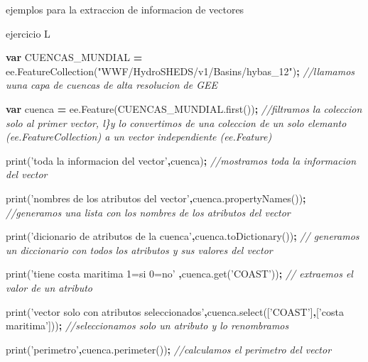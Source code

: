 \documentclass[
]{article}
\newenvironment{Shaded}{\begin{snugshade}}{\end{snugshade}}
\newcommand{\AttributeTok}[1]{\textcolor[rgb]{0.77,0.63,0.00}{#1}}
\newcommand{\CommentTok}[1]{\textcolor[rgb]{0.56,0.35,0.01}{\textit{#1}}}
\newcommand{\KeywordTok}[1]{\textcolor[rgb]{0.13,0.29,0.53}{\textbf{#1}}}
\newcommand{\NormalTok}[1]{#1}
\newcommand{\OperatorTok}[1]{\textcolor[rgb]{0.81,0.36,0.00}{\textbf{#1}}}
\newcommand{\StringTok}[1]{\textcolor[rgb]{0.31,0.60,0.02}{#1}}
\newcommand{\VariableTok}[1]{\textcolor[rgb]{0.00,0.00,0.00}{#1}}
\begin{document}
ejemplos para la extraccion de informacion de vectores

ejercicio L

\begin{Shaded}
\begin{Highlighting}[]
\KeywordTok{var}\NormalTok{ CUENCAS_MUNDIAL }\OperatorTok{=} \VariableTok{ee}\NormalTok{.}\AttributeTok{FeatureCollection}\NormalTok{(}\StringTok{"WWF/HydroSHEDS/v1/Basins/hybas_12"}\NormalTok{)}\OperatorTok{;} \CommentTok{//llamamos uuna capa de cuencas de alta resolucion de GEE}

\KeywordTok{var}\NormalTok{ cuenca }\OperatorTok{=} \VariableTok{ee}\NormalTok{.}\AttributeTok{Feature}\NormalTok{(}\VariableTok{CUENCAS_MUNDIAL}\NormalTok{.}\AttributeTok{first}\NormalTok{())}\OperatorTok{;} \CommentTok{//filtramos la coleccion solo al primer vector, l\}y lo convertimos de una coleccion de un solo elemanto (ee.FeatureCollection) a un vector independiente (ee.Feature)}

\AttributeTok{print}\NormalTok{(}\StringTok{'toda la informacion del vector'}\OperatorTok{,}\NormalTok{cuenca)}\OperatorTok{;} \CommentTok{//mostramos toda la informacion del vector}

\AttributeTok{print}\NormalTok{(}\StringTok{'nombres de los atributos del vector'}\OperatorTok{,}\VariableTok{cuenca}\NormalTok{.}\AttributeTok{propertyNames}\NormalTok{())}\OperatorTok{;} \CommentTok{//generamos una lista con los nombres de los atributos del vector}

\AttributeTok{print}\NormalTok{(}\StringTok{'dicionario de atributos de la cuenca'}\OperatorTok{,}\VariableTok{cuenca}\NormalTok{.}\AttributeTok{toDictionary}\NormalTok{())}\OperatorTok{;} \CommentTok{// generamos un diccionario con todos los atributos y sus valores del vector}

\AttributeTok{print}\NormalTok{(}\StringTok{'tiene costa maritima 1=si 0=no'} \OperatorTok{,}\VariableTok{cuenca}\NormalTok{.}\AttributeTok{get}\NormalTok{(}\StringTok{'COAST'}\NormalTok{))}\OperatorTok{;} \CommentTok{// extraemos el valor de un atributo}

\AttributeTok{print}\NormalTok{(}\StringTok{'vector solo con atributos seleccionados'}\OperatorTok{,}\VariableTok{cuenca}\NormalTok{.}\AttributeTok{select}\NormalTok{([}\StringTok{'COAST'}\NormalTok{]}\OperatorTok{,}\NormalTok{[}\StringTok{'costa maritima'}\NormalTok{]))}\OperatorTok{;} \CommentTok{//seleccionamos solo un atributo y lo renombramos}

\AttributeTok{print}\NormalTok{(}\StringTok{'perimetro'}\OperatorTok{,}\VariableTok{cuenca}\NormalTok{.}\AttributeTok{perimeter}\NormalTok{())}\OperatorTok{;} \CommentTok{//calculamos el perimetro del vector}


\end{Highlighting}
\end{Shaded}
\end{document}
